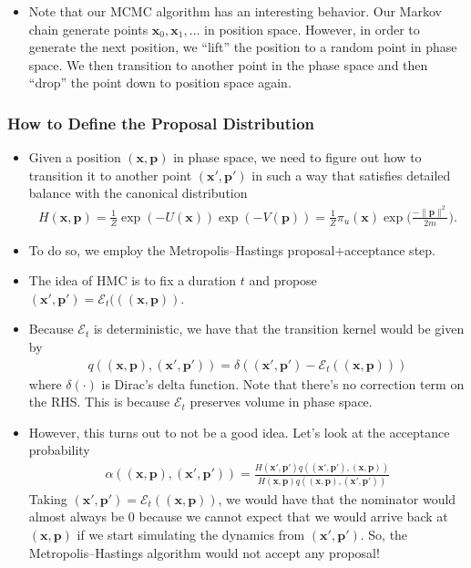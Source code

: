 \documentclass[10pt]{article}
\newcommand{\ve}[1]{\mathbf{#1}}
\newcommand{\mcal}[1]{\mathcal{#1}}
\begin{document}
\begin{itemize}
  \item Note that our MCMC algorithm has an interesting behavior. Our Markov chain generate points $\ve{x}_0, \ve{x}_1, \dotsc$ in position space. However, in order to generate the next position, we ``lift'' the position to a random point in phase space. We then transition to another point in the phase space and then ``drop'' the point down to position space again.
\end{itemize}

\subsubsection{How to Define the Proposal Distribution}

\begin{itemize}
  \item Given a position $(\ve{x},\ve{p})$ in phase space, we need to figure out how to transition it to another point $(\ve{x}',\ve{p}')$ in such a way that satisfies detailed balance with the canonical distribution
  \begin{align*}
    H(\ve{x},\ve{p}) = \frac{1}{Z} \exp(-U(\ve{x}))\exp(-V(\ve{p})) = \frac{1}{Z} \pi_u(\ve{x}) \exp\bigg( \frac{-\| \ve{p} \|^2}{2m} \bigg).
  \end{align*}
  
  \item To do so, we employ the Metropolis--Hastings proposal+acceptance step.

  \item The idea of HMC is to fix a duration $t$ and propose $(\ve{x}',\ve{p}') = \mcal{E}_t(((\ve{x},\ve{p}))$.
  
  \item Because $\mcal{E}_t$ is deterministic, we have that the transition kernel would be given by
  \begin{align*}
    q((\ve{x},\ve{p}), (\ve{x}',\ve{p}')) = \delta((\ve{x}',\ve{p}') - \mcal{E}_t((\ve{x},\ve{p})))
  \end{align*}
  where $\delta(\cdot)$ is Dirac's delta function. Note that there's no correction term on the RHS. This is because $\mcal{E}_t$ preserves volume in phase space.

  \item However, this turns out to not be a good idea. Let's look at the acceptance probability
  \begin{align*}
    \alpha((\ve{x},\ve{p}), (\ve{x}',\ve{p}')) = \frac{H(\ve{x}',\ve{p}') q((\ve{x'},\ve{p}'),(\ve{x},\ve{p}))}{H(\ve{x},\ve{p})q((\ve{x},\ve{p}),(\ve{x}',\ve{p}'))}
  \end{align*}
  Taking $(\ve{x}',\ve{p}') = \mcal{E}_t((\ve{x},\ve{p}))$, we would have that the nominator would almost always be $0$ because we cannot expect that we would arrive back at $(\ve{x},\ve{p})$ if we start simulating the dynamics from $(\ve{x}',\ve{p}')$. So, the Metropolis--Hastings algorithm would not accept any proposal!
  

\end{itemize}
\end{document}
